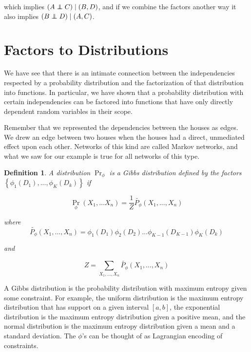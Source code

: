 \documentclass{article}
\newcommand\independent{\protect\mathpalette{\protect\independenT}{\perp}}
\def\independenT#1#2{\mathrel{\rlap{$#1#2$}\mkern2mu{#1#2}}}
\newtheorem{mydef}{Definition}
\begin{document}
which implies $(A\independent C) \mid (B,D)$, and if we combine the factors 
another way it also implies $(B\independent D) \mid (A,C)$.

\section{Factors to Distributions}
We have see that there is an intimate connection between the
independencies respected by a probability distribution and the
factorization of that distribution into functions. In particular, we
have shown that a probability distribution with certain independencies
can be factored into functions that have only directly dependent
random variables in their scope.

Remember that we represented the dependencies between the houses as
edges. We drew an edge between two houses when the houses had a
direct, unmediated effect upon each other. Networks of this kind are
called Markov networks, and what we saw for our example is true for
all networks of this type.

\begin{mydef}
A distribution $\Pr_{\phi}$ is a Gibbs distribution defined by the factors
$\left\{\phi_1(D_1),...,\phi_K(D_k)\right\}$ if

\begin{equation}
\Pr_{\phi}(X_1,...X_n) = \frac{1}{Z}\tilde{P_{\phi}}(X_1,...,X_n)
\end{equation}

where
\begin{equation}
\tilde{P_{\phi}}(X_1,...,X_n) = \phi_1(D_1)\phi_2(D_2)...\phi_{K-1}(D_{K-1})\phi_K(D_k)
\end{equation}

and

\begin{equation}
Z = \sum_{X_1,...,X_n}\tilde{P_{\phi}}(X_1,...,X_n)
\end{equation}
\end{mydef}

A Gibbs distribution is the probability distribution with maximum
entropy given some constraint. For example, the uniform distribution
is the maximum entropy distribution that has support on a given
interval $[a,b]$, the exponential distribution is the maximum entropy
distribution given a positive mean, and the normal distribution is the
maximum entropy distribution given a mean and a standard
deviation. The $\phi$'s can be thought of as Lagrangian encoding of
constraints.
\end{document}
